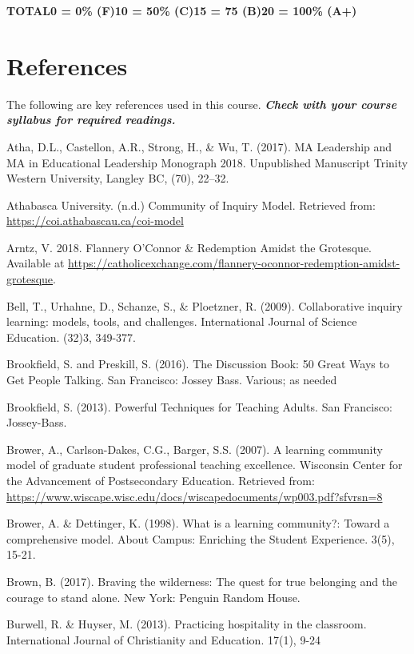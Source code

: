 \documentclass[
]{book}
\begin{document}
\textbar{}\textbf{TOTAL}\textbar{}\textbf{0 = 0\% (F)}\textbar{}\textbf{10 = 50\% (C)}\textbar{}\textbf{15 = 75 (B)}\textbar{}\textbf{20 = 100\% (A+)}\textbar{}

\hypertarget{references-6}{%
\chapter*{References}\label{references-6}}

The following are key references used in this course. \textbf{\emph{Check with your course syllabus for required readings.}}

Atha, D.L., Castellon, A.R., Strong, H., \& Wu, T. (2017). MA Leadership and MA in Educational Leadership Monograph 2018. Unpublished Manuscript Trinity Western University, Langley BC, (70), 22--32.

Athabasca University. (n.d.) Community of Inquiry Model. Retrieved from: \url{https://coi.athabascau.ca/coi-model}

Arntz, V. 2018. Flannery O'Connor \& Redemption Amidst the Grotesque. Available at \url{https://catholicexchange.com/flannery-oconnor-redemption-amidst-grotesque}.

Bell, T., Urhahne, D., Schanze, S., \& Ploetzner, R. (2009). Collaborative inquiry learning: models, tools, and challenges. International Journal of Science Education. (32)3, 349-377.

Brookfield, S. and Preskill, S. (2016). The Discussion Book: 50 Great Ways to Get People Talking. San Francisco: Jossey Bass. Various; as needed

Brookfield, S. (2013). Powerful Techniques for Teaching Adults. San Francisco: Jossey-Bass.

Brower, A., Carlson-Dakes, C.G., Barger, S.S. (2007). A learning community model of graduate student professional teaching excellence. Wisconsin Center for the Advancement of Postsecondary Education. Retrieved from: \url{https://www.wiscape.wisc.edu/docs/wiscapedocuments/wp003.pdf?sfvrsn=8}

Brower, A. \& Dettinger, K. (1998). What is a learning community?: Toward a comprehensive model. About Campus: Enriching the Student Experience. 3(5), 15-21.

Brown, B. (2017). Braving the wilderness: The quest for true belonging and the courage to stand alone. New York: Penguin Random House.

Burwell, R. \& Huyser, M. (2013). Practicing hospitality in the classroom. International Journal of Christianity and Education. 17(1), 9-24
\end{document}
